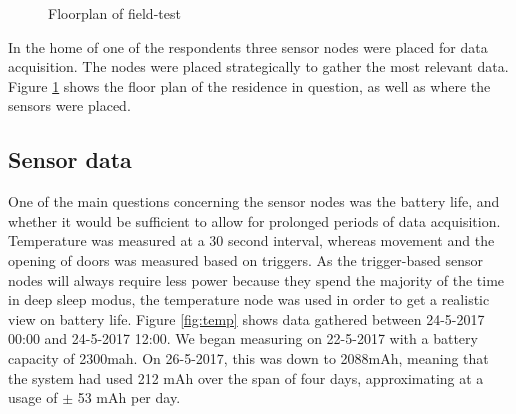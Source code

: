 \documentclass{below-ext}
\begin{document}
\begin{figure}
\label{fig:floorplan}
\caption{Floorplan of field-test}
\end{figure}
In the home of one of the respondents three sensor nodes were placed for data acquisition. The nodes were placed strategically to gather the most relevant data. Figure \ref{fig:floorplan} shows the floor plan of the residence in question, as well as where the sensors were placed.

\subsection{Sensor data}
One of the main questions concerning the sensor nodes was the battery life, and whether it would be sufficient to allow for prolonged periods of data acquisition. Temperature was measured at a 30 second interval, whereas movement and the opening of doors was measured based on triggers. As the trigger-based sensor nodes will always require less power because they spend the majority of the time in deep sleep modus, the temperature node was used in order to get a realistic view on battery life. Figure  \ref{fig:temp} shows data gathered between 24-5-2017 00:00 and 24-5-2017 12:00. We began measuring on 22-5-2017 with a battery capacity of 2300mah. On 26-5-2017, this was down to 2088mAh, meaning that the system had used 212 mAh over the span of four days, approximating at a usage of  $\pm$ 53 mAh per day.
\end{document}
